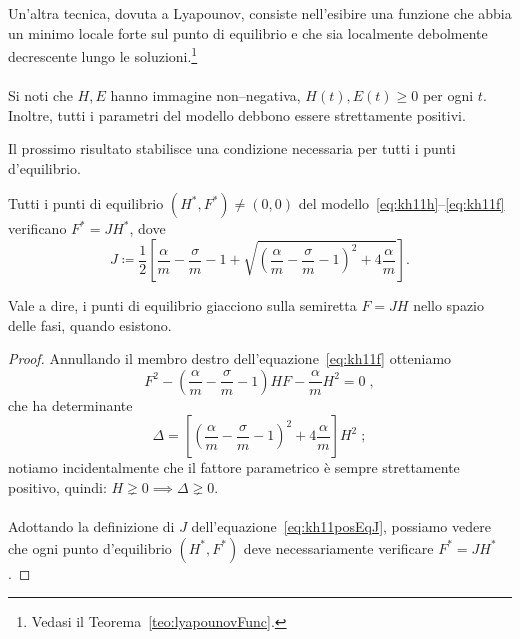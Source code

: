 Un'altra tecnica, dovuta a Lyapounov, consiste nell'esibire una funzione che abbia un minimo
locale forte sul punto di equilibrio e che sia localmente debolmente decrescente lungo le
soluzioni.\footnote{Vedasi il Teorema~\ref{teo:lyapounovFunc}.}

\paragraph{}
Si noti che $H, E$ hanno immagine non--negativa, \ie $H(t), E(t) \geq 0$ per ogni $t$.
Inoltre, tutti i parametri del modello debbono essere strettamente positivi.

Il prossimo risultato stabilisce una condizione necessaria per tutti i punti d'equilibrio.

\begin{lemma}
    \label{lem:necessJ}
    Tutti i punti di equilibrio $(H^*, F^*) \neq (0,0)$
    del modello~\eqref{eq:kh11h}--\eqref{eq:kh11f} verificano $F^* = J H^*$, dove
    \begin{equation}
        J \coloneq \frac{1}{2} \left[
            \frac{\alpha}{m} - \frac{\sigma}{m} - 1 +
            \sqrt{ {\left( \frac{\alpha}{m} - \frac{\sigma}{m} - 1 \right)}^2
                + 4 \frac{\alpha}{m}
            }
        \right].
        \label{eq:kh11posEqJ}
    \end{equation}
\end{lemma}

Vale a dire, i punti di equilibrio giacciono sulla semiretta $F= JH$ nello spazio delle fasi, quando esistono.

\begin{proof}
    Annullando il membro destro dell'equazione~\eqref{eq:kh11f} otteniamo
    $$F^2 - \left( \frac{\alpha}{m} - \frac{\sigma}{m} -1
        \right) H F - \frac{\alpha}{m} H^2 = 0 \; ,$$
    che ha determinante
    $$\Delta = \left[ {\left( \frac{\alpha}{m} - \frac{\sigma}{m} -1
        \right)}^2 + 4 \frac{\alpha}{m}
        \right] H^2 \; ; $$
    notiamo incidentalmente che il fattore parametrico è sempre strettamente positivo, quindi:
    $H \gneq 0 \implies \Delta \gneq 0$.

    \paragraph{}
    Adottando la definizione di $J$ dell'equazione~\eqref{eq:kh11posEqJ}, possiamo vedere
    che ogni punto d'equilibrio $(H^*, F^*)$ deve necessariamente verificare $F^* = J H^*$.
\end{proof}


